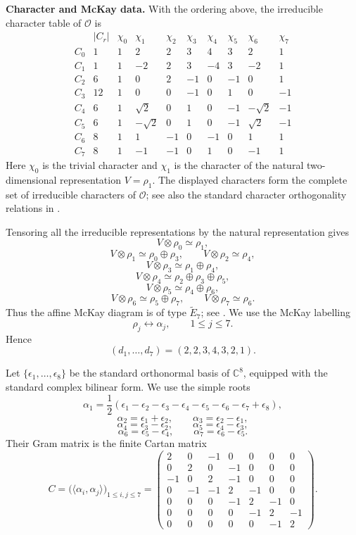 \documentclass[a4paper,reqno]{amsart}
\theoremstyle{plain} %
\theoremstyle{definition} %
\theoremstyle{remark} %
\newcommand{\1}{\mathds{1}}   %
\begin{document}
\medskip

\noindent\textbf{Character and McKay data.}
With the ordering above, the irreducible character table of
\(\mathcal O\) is
\[
\begin{array}{c|c|cccccccc}
 & |C_r|
 & \chi_0 & \chi_1 & \chi_2 & \chi_3
 & \chi_4 & \chi_5 & \chi_6 & \chi_7 \\ \hline
C_0 & 1
& 1&2&2&3&4&3&2&1\\
C_1 & 1
& 1&-2&2&3&-4&3&-2&1\\
C_2 & 6
& 1&0&2&-1&0&-1&0&1\\
C_3 & 12
& 1&0&0&-1&0&1&0&-1\\
C_4 & 6
& 1&\sqrt2&0&1&0&-1&-\sqrt2&-1\\
C_5 & 6
& 1&-\sqrt2&0&1&0&-1&\sqrt2&-1\\
C_6 & 8
& 1&1&-1&0&-1&0&1&1\\
C_7 & 8
& 1&-1&-1&0&1&0&-1&1
\end{array}
\]
Here \(\chi_0\) is the trivial character and $\chi_1$ is the character of the natural two-dimensional representation $V=\rho_1$. The displayed
characters form the complete set of irreducible characters of
\(\mathcal O\); see also the standard character orthogonality relations
in \cite[Sec.~2.3]{Serre77}.

Tensoring all the irreducible representations by the natural representation gives
\[
V\otimes\rho_0\simeq\rho_1,
\]
\[
V\otimes\rho_1\simeq\rho_0\oplus\rho_3,
\qquad
V\otimes\rho_2\simeq\rho_4,
\]
\[
V\otimes\rho_3\simeq\rho_1\oplus\rho_4,
\]
\[
V\otimes\rho_4\simeq\rho_2\oplus\rho_3\oplus\rho_5,
\]
\[
V\otimes\rho_5\simeq\rho_4\oplus\rho_6,
\]
\[
V\otimes\rho_6\simeq\rho_5\oplus\rho_7,
\qquad
V\otimes\rho_7\simeq\rho_6.
\]
Thus the affine McKay diagram is of type \(\widetilde E_7\);
see \cite{McKay}.  We use the McKay labelling
\[
\rho_j\longleftrightarrow\alpha_j,
\qquad
1\le j\le7.
\]
Hence
\[
(d_1,\ldots,d_7)
=
(2,2,3,4,3,2,1).
\]

Let $\{ \epsilon_1,\ldots,\epsilon_8 \}$ 
be the standard orthonormal basis of \(\mathbb C^8\), equipped with
the standard complex bilinear form.  We use the simple roots
\[
\alpha_1
=
\frac12
\left(
\epsilon_1-\epsilon_2-\epsilon_3-\epsilon_4
-\epsilon_5-\epsilon_6-\epsilon_7+\epsilon_8
\right),
\]
\[
\alpha_2=\epsilon_1+\epsilon_2,
\qquad
\alpha_3=\epsilon_2-\epsilon_1,
\]
\[
\alpha_4=\epsilon_3-\epsilon_2,
\qquad
\alpha_5=\epsilon_4-\epsilon_3,
\]
\[
\alpha_6=\epsilon_5-\epsilon_4,
\qquad
\alpha_7=\epsilon_6-\epsilon_5.
\]
Their Gram matrix is the finite Cartan matrix
\[
C=
\bigl(\langle\alpha_i,\alpha_j\rangle\bigr)_{1\le i,j\le7}
=
\begin{pmatrix}
2&0&-1&0&0&0&0\\
0&2&0&-1&0&0&0\\
-1&0&2&-1&0&0&0\\
0&-1&-1&2&-1&0&0\\
0&0&0&-1&2&-1&0\\
0&0&0&0&-1&2&-1\\
0&0&0&0&0&-1&2
\end{pmatrix}.
\]
\end{document}
